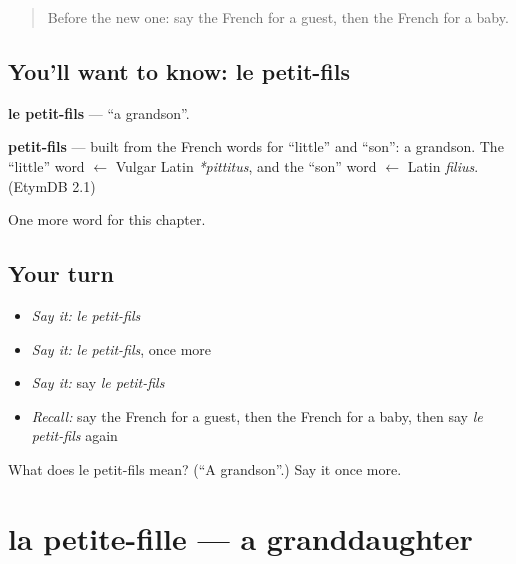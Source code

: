 \label{lesson:FR-C58-petit-fils}



\begin{quote}
Before the new one: say the French for a guest, then the French for a baby.
\end{quote}

\subsection*{You'll want to know: le petit-fils}
\textbf{le petit-fils} — \textquotedblleft{}a grandson\textquotedblright{}.

\begin{cousinweb}
\textbf{petit-fils} — built from the French words for \textquotedblleft{}little\textquotedblright{} and \textquotedblleft{}son\textquotedblright{}: a grandson. The \textquotedblleft{}little\textquotedblright{} word $\leftarrow$ Vulgar Latin \emph{*pittitus}, and the \textquotedblleft{}son\textquotedblright{} word $\leftarrow$ Latin \emph{filius}. (EtymDB 2.1)
\end{cousinweb}

\begin{grammarlens}[title={What you've built}]
One more word for this chapter.
\end{grammarlens}

\subsection*{Your turn}
\begin{itemize}
\raggedright
  \item \emph{Say it:} \emph{le petit-fils}
  \item \emph{Say it:} \emph{le petit-fils}, once more
  \item \emph{Say it:} say \emph{le petit-fils}
  \item \emph{Recall:} say the French for a guest, then the French for a baby, then say \emph{le petit-fils} again
\end{itemize}

\begin{tcolorbox}[breakable,colback=teal!4,colframe=teal!35!black,title={Before you move on}]
What does le petit-fils mean? (\textquotedblleft{}A grandson\textquotedblright{}.) Say it once more.
\end{tcolorbox}
\section[la petite-fille]{la petite-fille — a granddaughter}

